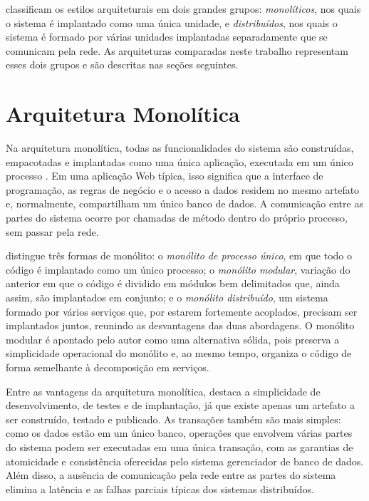  classificam os estilos arquiteturais em dois grandes grupos:
\textit{monolíticos}, nos quais o sistema é implantado como uma única unidade, e
\textit{distribuídos}, nos quais o sistema é formado por várias unidades implantadas
separadamente que se comunicam pela rede. As arquiteturas comparadas neste trabalho
representam esses dois grupos e são descritas nas seções seguintes.

\section{Arquitetura Monolítica}

Na arquitetura monolítica, todas as funcionalidades do sistema são construídas, empacotadas e
implantadas como uma única aplicação, executada em um único processo
\cite{richardson2018}. Em uma aplicação Web típica, isso significa que a interface de
programação, as regras de negócio e o acesso a dados residem no mesmo artefato e,
normalmente, compartilham um único banco de dados. A comunicação entre as partes do sistema
ocorre por chamadas de método dentro do próprio processo, sem passar pela rede.

 distingue três formas de monólito: o \textit{monólito de processo
único}, em que todo o código é implantado como um único processo; o \textit{monólito
modular}, variação do anterior em que o código é dividido em módulos bem delimitados que,
ainda assim, são implantados em conjunto; e o \textit{monólito distribuído}, um sistema
formado por vários serviços que, por estarem fortemente acoplados, precisam ser implantados
juntos, reunindo as desvantagens das duas abordagens. O monólito modular é apontado pelo autor
como uma alternativa sólida, pois preserva a simplicidade operacional do monólito e, ao mesmo
tempo, organiza o código de forma semelhante à decomposição em serviços.

Entre as vantagens da arquitetura monolítica,  destaca a
simplicidade de desenvolvimento, de testes e de implantação, já que existe apenas um artefato
a ser construído, testado e publicado. As transações também são mais simples: como os dados
estão em um único banco, operações que envolvem várias partes do sistema podem ser executadas
em uma única transação, com as garantias de atomicidade e consistência oferecidas pelo
sistema gerenciador de banco de dados. Além disso, a ausência de comunicação pela rede entre
as partes do sistema elimina a latência e as falhas parciais típicas dos sistemas
distribuídos.

